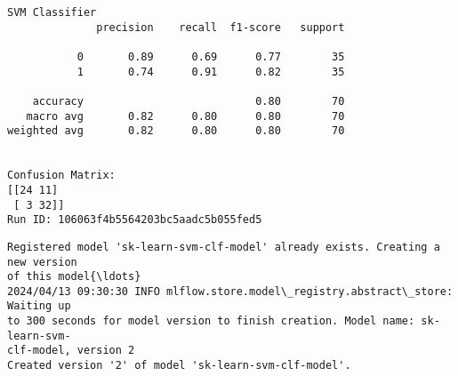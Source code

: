 \documentclass[11pt]{article}
\begin{document}
    \begin{Verbatim}[commandchars=\\\{\}]
SVM Classifier
              precision    recall  f1-score   support

           0       0.89      0.69      0.77        35
           1       0.74      0.91      0.82        35

    accuracy                           0.80        70
   macro avg       0.82      0.80      0.80        70
weighted avg       0.82      0.80      0.80        70


Confusion Matrix:
[[24 11]
 [ 3 32]]
Run ID: 106063f4b5564203bc5aadc5b055fed5
    \end{Verbatim}

    \begin{Verbatim}[commandchars=\\\{\}]
Registered model 'sk-learn-svm-clf-model' already exists. Creating a new version
of this model{\ldots}
2024/04/13 09:30:30 INFO mlflow.store.model\_registry.abstract\_store: Waiting up
to 300 seconds for model version to finish creation. Model name: sk-learn-svm-
clf-model, version 2
Created version '2' of model 'sk-learn-svm-clf-model'.
    \end{Verbatim}
\end{document}
